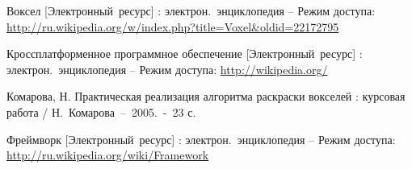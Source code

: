 \begin{thebibliography}{99}
		Воксел [Электронный~ресурс] : электрон.~энциклопедия -- Режим доступа: \url{http://ru.wikipedia.org/w/index.php?title=Voxel&oldid=22172795}

		Кроссплатформенное программное обеспечение [Электронный~ресурс] : электрон.~энциклопедия -- Режим доступа:
		\url{http://wikipedia.org/}

		Комарова, Н. Практическая реализация алгоритма раскраски вокселей : курсовая работа / 
		Н.~Комарова~--~2005.~-~23 с.

		Фреймворк [Электронный~ресурс] : электрон.~энциклопедия -- Режим доступа:
		\url{http://ru.wikipedia.org/wiki/Framework}




\end{thebibliography}

